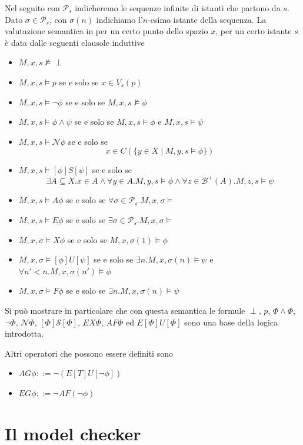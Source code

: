 \documentclass[a4paper,11pt]{article}
\newcommand{\Near}{\mathcal{N}}
\newcommand{\Surr}{\mathcal{S}}
\renewcommand{\(}{\left(}
\renewcommand{\)}{\right)}
\newcommand{\<}{\textlangle}
\renewcommand{\>}{\textrangle}
\begin{document}
Nel seguito con $\mathcal{P}_s$ indicheremo le sequenze infinite di istanti che partono da $s$. Dato $\sigma \in \mathcal{P}_s$, con $\sigma(n)$ indichiamo l'$n$-esimo istante della sequenza. La valutazione semantica in per un certo punto dello spazio $x$, per un certo istante $s$ è data dalle seguenti clausole induttive
\begin{itemize}
 \item $M,x,s \not \vDash \perp$
 \item $M,x,s \vDash p$ se e solo se $x\in V_s(p)$
 \item $M,x,s \vDash \neg \phi$ se e solo se $M,x,s \not\vDash \phi$
 \item $M,x,s \vDash \phi \wedge \psi$ se e solo se $M,x,s \vDash \phi$ e $M,x,s \vDash \psi$
 \item $M,x,s \vDash \Near \phi$ se e solo se \[ x\in C \( \{ y\in X \mid M,y,s\vDash \phi \} \) \]
 \item $M,x,s \vDash [\phi] S [\psi]$ se e solo se \[ \exists A \subseteq X . x\in A \wedge \forall y \in A . M,y,s\vDash \phi \wedge \forall z \in \mathcal{B}^+(A).M,z,s\vDash \psi \]
 \item $M,x,s \vDash A\phi $ se e solo se $\forall \sigma \in \mathcal{P}_s . M,x,\sigma \vDash $
 \item $M,x,s \vDash E\phi $ se e solo se $\exists \sigma \in \mathcal{P}_s . M,x,\sigma \vDash $
 \item $M,x,\sigma \vDash X\phi$ se e solo se $M,x,\sigma(1) \vDash \phi$
 \item $M,x,\sigma \vDash [\phi] U [\psi]$ se e solo se $\exists n . M,x,\sigma(n) \vDash \psi$ e $\forall n' < n . M,x,\sigma(n') \vDash \phi$
 \item $M,x,\sigma \vDash F \phi$ se e solo se $\exists n . M,x,\sigma(n) \vDash \psi$
\end{itemize}

Si può mostrare in particolare che con questa semantica le formule $\perp$, $p$, $\Phi \wedge \Phi$, $\neg \Phi$, $\Near \Phi$, $[\Phi] \Surr [\Phi]$, $EX \Phi$, $AF \Phi$ ed $E[\Phi]U[\Phi]$ sono una base della logica introdotta.

Altri operatori che possono essere definiti sono
\begin{itemize}
 \item $AG \phi ::= \neg ( E [T ] U [\neg \phi ] )$
 \item $EG \phi ::= \neg AF (\neg \phi) $
\end{itemize}


\section{Il model checker}
\end{document}
